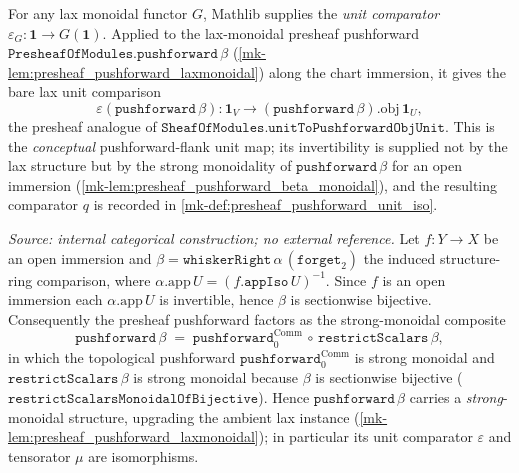 \begin{definition}
  \label{mk-def:presheaf_pushforward_unit_eps}
  \mathlibok

  For any lax monoidal functor \(G\), Mathlib supplies the \emph{unit comparator}
  \(\varepsilon_G : \mathbf 1 \to G(\mathbf 1)\). Applied to the lax-monoidal presheaf pushforward
  \(\mathtt{PresheafOfModules.pushforward}\,\beta\) (\ref{mk-lem:presheaf_pushforward_laxmonoidal}) along
  the chart immersion, it gives the bare lax unit comparison
  \[
    \varepsilon(\mathtt{pushforward}\,\beta) :
      \mathbf 1_V \longrightarrow (\mathtt{pushforward}\,\beta).\mathrm{obj}\,\mathbf 1_U ,
  \]
  the presheaf analogue of \(\mathtt{SheafOfModules.unitToPushforwardObjUnit}\). This is the
  \emph{conceptual} pushforward-flank unit map; its invertibility is supplied not by the lax
  structure but by the strong monoidality of \(\mathtt{pushforward}\,\beta\) for an open immersion
  (\ref{mk-lem:presheaf_pushforward_beta_monoidal}), and the resulting comparator \(q\) is recorded in
  \ref{mk-def:presheaf_pushforward_unit_iso}.
\end{definition}

\begin{lemma}\label{mk-lem:presheaf_pushforward_beta_monoidal}
  \leanok

  \textit{Source: internal categorical construction; no external reference.}
  Let \(f : Y \to X\) be an open immersion and \(\beta = \mathtt{whiskerRight}\,\alpha\,
  (\mathtt{forget}_2)\) the induced structure-ring comparison, where
  \(\alpha.\mathrm{app}\,U = (f.\mathtt{appIso}\,U)^{-1}\). Since \(f\) is an open immersion each
  \(\alpha.\mathrm{app}\,U\) is invertible, hence \(\beta\) is sectionwise bijective. Consequently the
  presheaf pushforward factors as the strong-monoidal composite
  \[
    \mathtt{pushforward}\,\beta \;=\;
      \mathtt{pushforward}_0^{\mathrm{Comm}} \,\circ\, \mathtt{restrictScalars}\,\beta ,
  \]
  in which the topological pushforward \(\mathtt{pushforward}_0^{\mathrm{Comm}}\) is strong monoidal
  and \(\mathtt{restrictScalars}\,\beta\) is strong monoidal because \(\beta\) is sectionwise
  bijective (\(\mathtt{restrictScalarsMonoidalOfBijective}\)). Hence \(\mathtt{pushforward}\,\beta\)
  carries a \emph{strong}-monoidal structure, upgrading the ambient lax instance
  (\ref{mk-lem:presheaf_pushforward_laxmonoidal}); in particular its unit comparator
  \(\varepsilon\) and tensorator \(\mu\) are isomorphisms.
\end{lemma}

